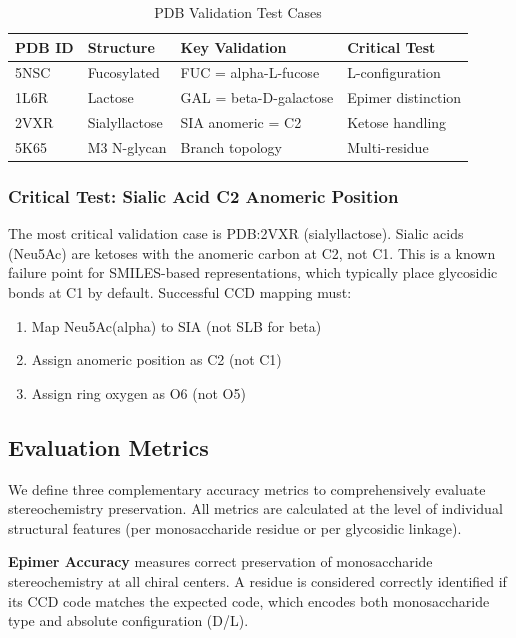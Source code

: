 \documentclass[11pt,a4paper]{article}
\begin{document}
\begin{table}[h]
\centering
\caption{PDB Validation Test Cases}
\begin{tabular}{llll}
\toprule
PDB ID & Structure & Key Validation & Critical Test \\
\midrule
5NSC & Fucosylated & FUC = alpha-L-fucose & L-configuration \\
1L6R & Lactose & GAL = beta-D-galactose & Epimer distinction \\
2VXR & Sialyllactose & SIA anomeric = C2 & Ketose handling \\
5K65 & M3 N-glycan & Branch topology & Multi-residue \\
\bottomrule
\end{tabular}
\label{tab:pdb_cases}
\end{table}

\subsubsection{Critical Test: Sialic Acid C2 Anomeric Position}

The most critical validation case is PDB:2VXR (sialyllactose). Sialic acids (Neu5Ac) are ketoses with the anomeric carbon at C2, not C1. This is a known failure point for SMILES-based representations, which typically place glycosidic bonds at C1 by default. Successful CCD mapping must:
\begin{enumerate}
\item Map Neu5Ac(alpha) to SIA (not SLB for beta)
\item Assign anomeric position as C2 (not C1)
\item Assign ring oxygen as O6 (not O5)
\end{enumerate}

\subsection{Evaluation Metrics}
\label{sec:metrics}

We define three complementary accuracy metrics to comprehensively evaluate stereochemistry preservation. All metrics are calculated at the level of individual structural features (per monosaccharide residue or per glycosidic linkage).

\textbf{Epimer Accuracy} measures correct preservation of monosaccharide stereochemistry at all chiral centers. A residue is considered correctly identified if its CCD code matches the expected code, which encodes both monosaccharide type and absolute configuration (D/L).
\end{document}
